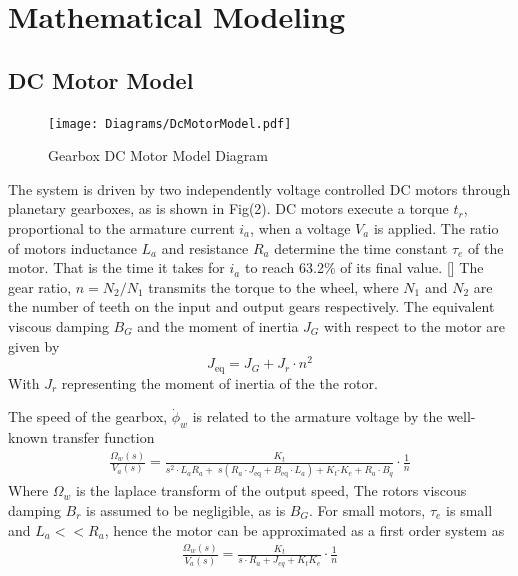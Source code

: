     \section{Mathematical Modeling} %
    \subsection{DC Motor Model}    
    \begin{figure}[H]
        \centering
            \texttt{[image: Diagrams/DcMotorModel.pdf]}
        \caption{Gearbox DC Motor Model Diagram}
    \end{figure}
    The system is driven by two independently voltage controlled DC motors through 
    planetary gearboxes, as is shown in Fig(2). 
    DC motors execute a torque $t_r$, proportional to the armature current $i_a$,
    when a voltage $V_a$ is applied.
    The ratio of motors inductance $L_a$ and resistance $R_a$ determine the
    time constant $\tau_e$ of the motor. That is the time it takes 
    for $i_a$ to reach 63.2\% of its final value. []
    The gear ratio, $n=N_2/N_1$ transmits the torque to the wheel, 
    where $N_1$ and $N_2$ are the number of teeth on the input and output gears respectively.
    The equivalent viscous damping 
    $B_G$ and the moment of inertia $J_G$ with respect to the motor are given by
    \begin{equation}
        J_{\text{eq}} = J_G + J_r \cdot n^2 
    \end{equation}
    With $J_r$ representing the moment of inertia of the the rotor.

    The speed of the gearbox, $\dot\phi_w$ is related to the armature voltage 
    by the well-known transfer function
    \begin{equation}
        \begin{aligned}
            \frac{\Omega_w \left(s\right)}{V_a \left(s\right)}=\frac{K_t }{s^2 \cdot L_a R_a +\;s\left(R_a \cdot J_{\mathrm{eq}} +B_{\mathrm{eq}} \cdot L_a \right)+K_t {\cdot K}_e +R_a \cdot B_q }\cdot\frac{1}{n}
        \end{aligned}
        \label{eq:DCMotor}
    \end{equation}
    Where $\Omega_w$ is the laplace transform of the output speed, 
    The rotors viscous damping $B_r$ is assumed to be negligible, as is $B_G$. 
    For small motors, $\tau_e$ is small and $L_a << R_a$, hence the motor can be 
    approximated as a first order system as
    \begin{equation}
        \begin{aligned}
            \frac{\Omega_w \left(s\right)}{V_a \left(s\right)}=\frac{K_t }{s\cdot R_a + J_{eq}+K_t K_e }\cdot\frac{1}{n}
        \end{aligned}
        \label{eq:DCMotorSimple}
    \end{equation}

